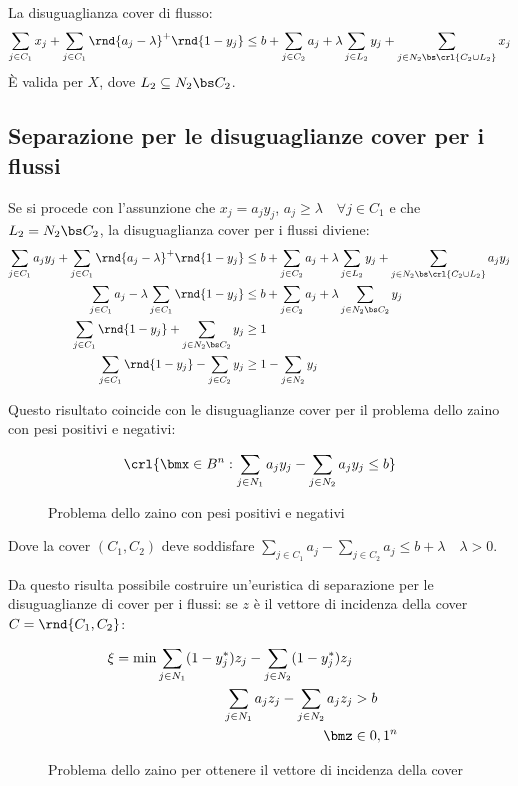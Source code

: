 \documentclass[\main/main.tex]{subfiles}
\begin{document}
\begin{proposition}
    La disuguaglianza cover di flusso:
    \[
        \sum_{j \in C_1} x_j + \sum_{j \in C_1} \rnd{a_j - \lambda}^+\rnd{1-y_j} \leq b + \sum_{j \in C_2} a_j + \lambda \sum_{j \in L_2}y_j + \sum_{j \in N_2 \bs \crl{C_2 \cup L_2}}x_j
    \]    È valida per \(X\), dove \(L_2 \subseteq N_2 \bs C_2\).
\end{proposition}

\subsection{Separazione per le disuguaglianze cover per i flussi}
Se si procede con l'assunzione che \(x_j = a_j y_j\), \(a_j \geq \lambda \quad \forall j \in C_1\) e che \(L_2 = N_2 \bs C_2\), la disuguaglianza cover per i flussi diviene:
\begin{align*}
    \sum_{j \in C_1} a_j y_j + \sum_{j \in C_1} \rnd{a_j - \lambda}^+\rnd{1-y_j} &\leq b + \sum_{j \in C_2} a_j + \lambda \sum_{j \in L_2}y_j + \sum_{j \in N_2 \bs \crl{C_2 \cup L_2}}a_j y_j\\
    \sum_{j \in C_1} a_j - \lambda\sum_{j \in C_1} \rnd{1-y_j} &\leq b + \sum_{j \in C_2} a_j + \lambda\sum_{j \in N_2 \bs C_2} y_j\\
    \sum_{j \in C_1} \rnd{1-y_j} + \sum_{j \in N_2 \bs C_2} y_j &\geq 1\\
    \sum_{j \in C_1} \rnd{1-y_j} - \sum_{j \in C_2} y_j &\geq 1 - \sum_{j \in N_2} y_j\\
\end{align*}

Questo risultato coincide con le disuguaglianze cover per il problema dello zaino con pesi positivi e negativi:

\begin{figure}
    \[
        \crl{\bmx \in B^n: \sum_{j \in N_1} a_j y_j - \sum_{j \in N_2} a_j y_j \leq b}
    \]    \caption{Problema dello zaino con pesi positivi e negativi}
\end{figure}

Dove la cover \((C_1, C_2)\) deve soddisfare \(\sum_{j \in C_1} a_j - \sum_{j \in C_2} a_j \leq b + \lambda \quad \lambda > 0\).

Da questo risulta possibile costruire un'euristica di separazione per le disuguaglianze di cover per i flussi: se \(z\) è il vettore di incidenza della cover \(C =\rnd{C_1, C_2}\):

\begin{figure}
    \begin{align*}
        \xi = \min \sum_{j \in N_1} (1- y^*_j)z_j - \sum_{j \in N_2} (1- y^*_j)z_j\\
        \sum_{j \in N_1} a_j z_j - \sum_{j \in N_2} a_j z_j &> b\\
        \bmz &\in {0,1}^n
    \end{align*}
    \caption{Problema dello zaino per ottenere il vettore di incidenza della cover}\label{zaino_cover}
\end{figure}
\end{document}
